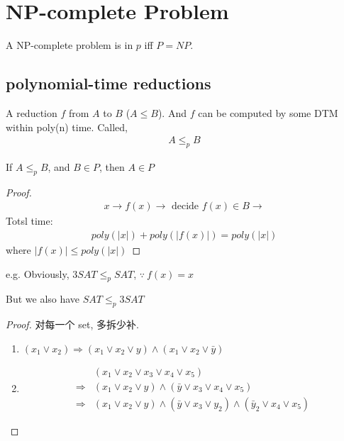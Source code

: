 \newpage

\section{NP-complete Problem}
\begin{definition}
    A NP-complete problem is in $p$ iff $P=NP$. 
\end{definition}

\subsection{polynomial-time reductions}

\begin{definition}
    A reduction $f$ from $A$ to $B$ ($A\le B$). And $f$ can be computed by some DTM within poly(n) time. Called,
    \begin{align*}
        A\le_p B
    \end{align*}
\end{definition}

\begin{theorem}
    If $A\le_p B$, and $B\in P$, then $A\in P$
\end{theorem}
\begin{proof}
    \begin{align*}
        x\to f(x)\to \text{ decide }f(x)\in B\to
    \end{align*}
    Totsl time:
    \begin{align*}
        poly(|x|)+poly(|f(x)|)= poly(|x|)
    \end{align*}
    where $|f(x)|\le poly(|x|)$
\end{proof}


e.g. Obviously, $3SAT\le_p SAT$, $\because\ f(x)=x$

But we also have $SAT\le_p 3SAT$
\begin{proof}
    对每一个 set, 多拆少补. 

    \begin{enumerate}
        \item $(x_1\lor x_2)\Rightarrow (x_1\lor x_2 \lor y)\land (x_1\lor x_2 \lor \bar{y})$
        \item \quad
        \begin{align*}
            &(x_1\lor x_2\lor x_3\lor x_4\lor x_5)\\
            \Rightarrow & (x_1\lor x_2\lor y)\land (\bar{y}\lor x_3\lor x_4\lor x_5)\\
            \Rightarrow & (x_1\lor x_2\lor y)\land (\bar{y}\lor x_3\lor y_2)\land(\bar{y}_2\lor x_4 \lor x_5)
        \end{align*}
    \end{enumerate}
\end{proof}

